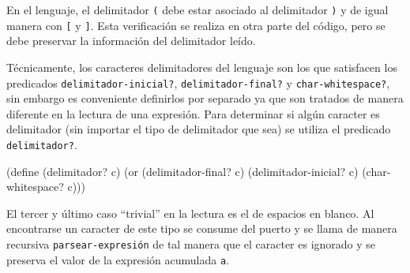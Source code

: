 \documentclass[letterpaper,twoside,openright,10pt]{book}
\begin{document}
\eatline
{}\nwendcode{}\nwdocspar

En el lenguaje, el delimitador {\tt{}{}{}(} debe estar asociado al delimitador {\tt{}{}{})} y de igual manera con {\tt{}{}{}[} y {\tt{}{}{}]}. Esta verificación se realiza en otra parte del código, pero se debe preservar la información del delimitador leído.

Técnicamente, los caracteres delimitadores del lenguaje son los que satisfacen los predicados {\tt{}\protect{}delimitador-inicial?}, {\tt{}\protect{}delimitador-final?} y {\tt{}char-whitespace?}, sin embargo es conveniente definirlos por separado ya que son tratados de manera diferente en la lectura de una expresión. Para determinar si algún caracter es delimitador (sin importar el tipo de delimitador que sea) se utiliza el predicado {\tt{}\protect{}delimitador?}.

\nwenddocs{}\plusendmoddef
(define (delimitador? c)
  (or (delimitador-final? c)
      (delimitador-inicial? c)
      (char-whitespace? c)))

\eatline
{}\nwendcode{}\nwdocspar

El tercer y último caso ``trivial'' en la lectura es el de espacios en blanco. Al encontrarse un caracter de este tipo se consume del puerto y se llama de manera recursiva {\tt{}\protect{}parsear-expresión} de tal manera que el caracter es ignorado y se preserva el valor de la expresión acumulada {\tt{}a}.
\end{document}
